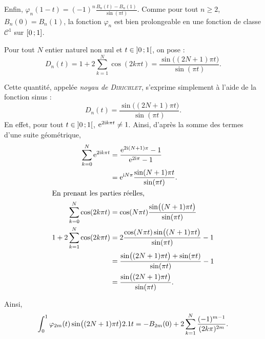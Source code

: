 \begin{elemsolution}
\begin{reponses}
\begin{itemize}
Enfin, $\varphi_n(1-t) = (-1)^n \frac{B_n(t) - B_n(1)}{\sin(\pi t)}$. Comme pour tout $n \geqslant 2$, $B_n(0) = B_n(1)$, la fonction $\varphi_n$ est bien prolongeable en une fonction de classe $\mathscr{C}^1$ sur $\left[0\,;1\right]$.
\end{itemize}
\end{reponses}

Pour tout $N$ entier naturel non nul et $t \in \left]0\,;1\right[$, on pose :
\[
D_n(t) = 1 + 2 \sum_{k=1}^N \cos(2k \pi t) = \frac{\sin\mathopen{}\big((2N+1) \pi t \big)}{\sin(\pi t)}.
\]

\begin{reponses}[resume]
\item Cette quantité, appelée \textsl{noyau de \textsc{Dirichlet}}, s'exprime simplement à l'aide de la fonction sinus :
\[
D_n(t) = \frac{\sin\mathopen{}\big((2N+1) \pi t \big)}{\sin(\pi t)}.
\]
En effet, pour tout $t \in \left]0\,;1\right[$, $\mathrm{e}^{2 \mathrm{i} k \pi t} \not= 1$. Ainsi, d'après la somme des termes d'une suite géométrique, 
    \begin{align*}
        \sum_{k=0}^N \mathrm{e}^{2 \mathrm{i} k \pi t} &= \frac{\mathrm{e}^{2 \mathrm{i} (N+1) \pi} - 1}{\mathrm{e}^{2 \mathrm{i} \pi} - 1} \\
        &= \mathrm{e}^{\mathrm{i} N \pi} \frac{\sin(N+1) \pi t}{\sin(\pi t)}. \\
        \intertext{En prenant les parties réelles,}
        \sum_{k=0}^N \cos(2 k \pi t) &= \cos(N \pi t) \frac{\sin\mathopen{}\big((N+1) \pi t \big)}{\sin(\pi t)} \\
        1 + 2 \sum_{k=1}^N \cos(2 k \pi t) &= 2 \frac{\cos(N \pi t) \sin\mathopen{}\big((N+1) \pi t\big)}{\sin(\pi t)} - 1 \\
        &= \frac{\sin\mathopen{}\big((2N+1) \pi t \big) + \sin( \pi t)}{\sin(\pi t)} - 1 \\
        &= \frac{\sin\mathopen{}\big((2N+1) \pi t \big)}{\sin(\pi t)}.
    \end{align*}

\item 
\begin{reponses}
    \item Ainsi,
\[
\int_0^1 \varphi_{2m}(t) \sin\mathopen{}\big((2N+1) \pi t \big) 2.1 t
= - B_{2m}(0) + 2 \sum_{k=1}^N \frac{(-1)^{m-1}}{(2 k \pi)^{2m}}.
\]


\end{reponses}
\end{reponses}
\end{elemsolution}
